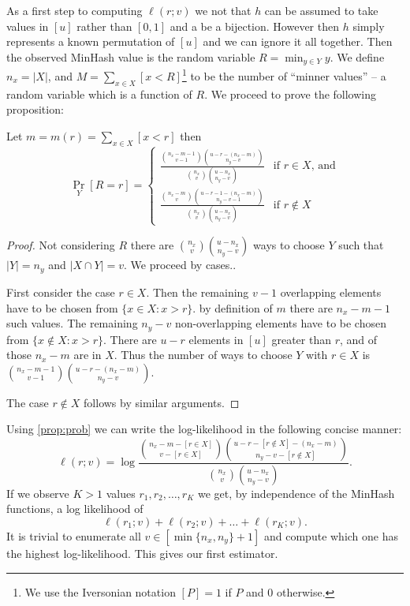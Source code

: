 As a first step to computing $\ell(r;v)$ we not that $h$ can be assumed to take values in $[u]$ rather than $[0,1]$ and a be a bijection.
However then $h$ simply represents a known permutation of $[u]$ and we can ignore it all together.
Then the observed MinHash value is the random variable $R=\min_{y\in Y} y$.
We define $n_x = |X|$, and $M = \sum_{x\in X} [x < R]$\footnote{We use the Iversonian notation $[P]=1$ if $P$ and $0$ otherwise.} to be the number of ``minner values'' -- a random variable which is a function of $R$.
We proceed to prove the following proposition:
\begin{proposition}
   Let $m=m(r)=\sum_{x\in X}[x < r]$ then
\[
   \Pr_Y[R=r]
    =
    \begin{cases}
      \frac{\binom{n_x-m-1}{v-1}\binom{u-r-(n_x-m)}{n_y-v}}{\binom{n_x}{v}\binom{u-n_x}{n_y-v}}
      &
      \text{if $r\in X$, and}
       \\
      \frac{\binom{n_x-m}{v}\binom{u-r-1-(n_x-m)}{n_y-v-1}}{\binom{n_x}{v}\binom{u-n_x}{n_y-v}}
      & \text{if $r\not\in X$}
    \end{cases}
 \]
 \label{prop:prob}
\vspace{-1em} %
\end{proposition}
\begin{proof}
   Not considering $R$ there are $\binom{n_x}{v}\binom{u-n_x}{n_y-v}$ ways to choose $Y$ such that $|Y|=n_y$ and $|X\cap Y|=v$.
   We proceed by cases..

   First consider the case $r\in X$.
   Then the remaining $v-1$ overlapping elements have to be chosen from $\{x\in X:x > r\}$.
   by definition of $m$ there are $n_x-m-1$ such values.
   The remaining $n_y-v$ non-overlapping elements have to be chosen from $\{x\not\in X: x > r \}$.
   There are $u-r$ elements in $[u]$ greater than $r$, and of those $n_x-m$ are in $X$.
   Thus the number of ways to choose $Y$ with $r\in X$ is
   $\binom{n_x-m-1}{v-1}\binom{u-r-(n_x-m)}{n_y-v}$.

   The case $r\not\in X$ follows by similar arguments.
\end{proof}

Using \cref{prop:prob} we can write the log-likelihood in the following concise manner:
\[
   \ell(r; v) = \log \frac{\binom{n_x-m-[r\in X]}{v-[r\in X]}\binom{u-r-[r\not\in X]-(n_x-m)}{n_y-v-[r\not\in X]}}{\binom{n_x}{v}\binom{u-n_x}{n_y-v}}.
   \label{eq:log-likelihood}
\]
If we observe $K>1$ values $r_1, r_2, \dots, r_K$ we get, by independence of the MinHash functions, a log likelihood of
\[
   \ell(r_1; v) + \ell(r_2; v) + \dots + \ell(r_K; v).
\]
It is trivial to enumerate all $v\in[\min\{n_x,n_y\}+1]$ and compute which one has the highest log-likelihood.
This gives our first estimator.


